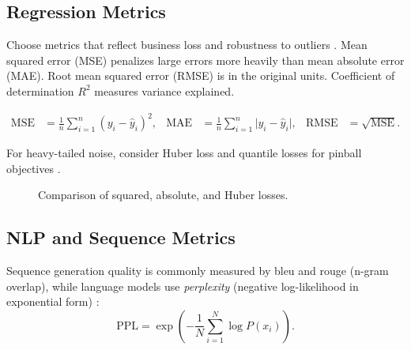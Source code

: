 \subsection{Regression Metrics}

Choose metrics that reflect business loss and robustness to outliers . Mean squared error (MSE) penalizes large errors more heavily than mean absolute error (MAE). Root mean squared error (RMSE) is in the original units. Coefficient of determination $R^2$ measures variance explained.

\begin{align}
\text{MSE} &= \frac{1}{n} \sum_{i=1}^{n} (y_i - \hat{y}_i)^2, &
\text{MAE} &= \frac{1}{n} \sum_{i=1}^{n} \lvert y_i - \hat{y}_i \rvert, &
\text{RMSE} &= \sqrt{\text{MSE}}.
\end{align}

For heavy-tailed noise, consider Huber loss and quantile losses for pinball objectives \textcite{Prince2023}.

\begin{figure}[h]
  \centering
  \caption{Comparison of squared, absolute, and Huber losses.}
  \label{fig:huber}
\end{figure}

\subsection{NLP and Sequence Metrics}

Sequence generation quality is commonly measured by \gls{bleu}  and \gls{rouge}  (n-gram overlap), while language models use \emph{perplexity} (negative log-likelihood in exponential form) \textcite{GoodfellowEtAl2016,D2LChapterRNN}:
\begin{equation}
\text{PPL} = \exp\left(-\frac{1}{N} \sum_{i=1}^{N} \log P(x_i)\right).
\end{equation}

